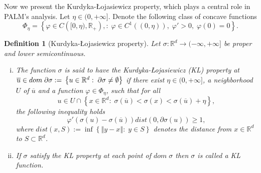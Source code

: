 \documentclass[12pt]{article}
\numberwithin{equation}{section}
\newtheorem{definition}{Definition}
\newcommand{\rr}{\mathbb{R}} %
\newcommand{\norm}[1]{\left\Vert {#1} \right\Vert} %
\begin{document}
Now we present the Kurdyka-{\L}ojasiewicz property, which plays a central role in PALM's analysis. Let $\eta \in (0,+\infty]$. Denote the following class of concave functions
\begin{equation*}
	\Phi_{\eta} = \left\lbrace \varphi \in C\left([0,\eta), \rr_+ \right)  , : \; \varphi \in C^1\left((0,\eta)\right), \; \varphi'>0, \; \varphi(0)=0 \right\rbrace .
\end{equation*}
\begin{definition}[Kurdyka-{\L}ojasiewicz property]
	Let $\sigma: \rr^d \rightarrow (-\infty,+\infty]$ be proper and lower semicontinuous.
	\begin{enumerate}[(i)]
		\item The function $\sigma$ is said to have the \textit{Kurdyka-{\L}ojasiewicz (KL) property} at $\overline{u} \in dom \; \partial\sigma := \\ \left\lbrace u \in \rr^d : \; \partial\sigma \neq \emptyset \right\rbrace$ if there exist $\eta \in (0,+\infty]$, a neighborhood $U$ of $\overline{u}$ and a function $\varphi \in \Phi_{\eta}$, such that for all
		\begin{equation*}
			u \in U \cap \left\lbrace x \in \rr^d : \; \sigma(\overline{u}) < \sigma(x) < \sigma(\overline{u}) + \eta \right\rbrace,
		\end{equation*}
		the following inequality holds
		\begin{equation*}
			\varphi'(\sigma(u) - \sigma(\overline{u}))dist(0,\partial\sigma(u)) \geq 1,
		\end{equation*}
		where $dist(x,S) := \inf \left\lbrace \norm{y-x} : \; y \in S\right\rbrace$ denotes the distance from $x \in \rr^d$ to $S \subset \rr^d$.
		\item If $\sigma$ satisfy the KL property at each point of $dom\;\sigma$ then $\sigma$ is called a \textit{KL function}.
	\end{enumerate}
\end{definition}
\end{document}
